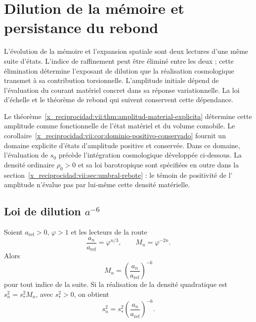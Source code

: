 


\chapter{Dilution de la mémoire et persistance du rebond}
\label{x_reciprocidad:vii:sec:dilucion-rebote}

L'évolution de la mémoire et l'expansion spatiale sont deux lectures d'une même suite d'états. L'indice de raffinement peut être éliminé entre les deux ; cette élimination détermine l'exposant de dilution que la réalisation cosmologique transmet à sa contribution torsionnelle. L'amplitude initiale dépend de l'évaluation du courant matériel concret dans sa réponse variationnelle. La loi d'échelle et le théorème de rebond qui suivent conservent cette dépendance.

Le théorème~\ref{x_reciprocidad:vii:thm:amplitud-material-explicita} détermine cette
amplitude comme fonctionnelle de l'état matériel et du volume comobile.
Le corollaire~\ref{x_reciprocidad:vii:cor:dominio-positivo-conservado} fournit
un domaine explicite d'états d'amplitude positive et conservée.
Dans ce domaine, l'évaluation de \(s_0\) précède l'intégration
cosmologique développée ci-dessous. La densité ordinaire
\(\rho_0>0\) et sa loi barotropique sont spécifiées en outre dans la
section~\ref{x_reciprocidad:vii:sec:umbral-rebote} : le témoin de positivité de l'
amplitude n'évalue pas par lui-même cette densité matérielle.

\section{Loi de dilution \texorpdfstring{\(a^{-6}\)}{a élevé à -6}}
\label{x_reciprocidad:vii:sec:dilucion}

\begin{proposition}
\label{x_reciprocidad:vii:prop:dilucion}
Soient \(a_{\mathrm{ref}}>0\), \(\varphi>1\) et les lecteurs de la route
\[
 \frac{a_n}{a_{\mathrm{ref}}}=\varphi^{n/3},\qquad
 M_n=\varphi^{-2n}.
\]
Alors
\[
 M_n=\left(\frac{a_n}{a_{\mathrm{ref}}}\right)^{-6}
\]
pour tout indice de la suite. Si la réalisation de la densité
quadratique est \(s_n^2=s_*^2M_n\), avec \(s_*^2>0\), on obtient
\[
 s_n^2=s_*^2\left(\frac{a_n}{a_{\mathrm{ref}}}\right)^{-6}.
\]
\end{proposition}

